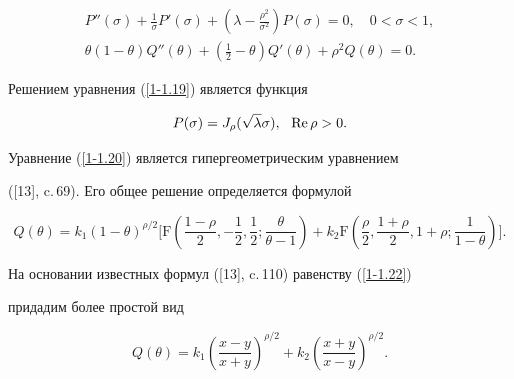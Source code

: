 \begin{gather}


P''(\sigma)+\frac{1}{\sigma}P'(\sigma)+


\left(\lambda -\frac{\rho^2}{\sigma^2}


\right)P(\sigma) = 0,\quad 0<\sigma<1,\label{1-1.19} \\


%


\theta(1-\theta )Q''(\theta)+\left(\frac12 - \theta\right)Q'(\theta) + 


\rho^2Q(\theta) = 0.\label{1-1.20}


\end{gather}


Решением уравнения (\ref{1-1.19}) является функция


\begin{equation}


P(\sigma)=J_{\rho}(\sqrt{\lambda}\sigma),


\ \ \re\rho >0.\label{1-1.21}


\end{equation}





Уравнение (\ref{1-1.20}) является гипергеометрическим уравнением 


([13], c.\,69). Его общее решение определяется формулой


\begin{equation}


Q(\theta)=k_1(1-\theta)^{\rho/2}\bigg[


{\mathrm F}\left(\frac{1-\rho}{2},-\frac12,


\frac12;\frac{\theta}{\theta-1}\right) +


k_2{\mathrm F}\left(\frac\rho2,\frac{1+\rho}{2},


1+\rho;\frac{1}{1-\theta}\right)\bigg].\label{1-1.22}


\end{equation}





На основании известных формул ([13], c.\,110) равенству (\ref{1-1.22}) 


придадим более простой вид


\begin{equation}


Q(\theta)=k_1\left(\frac{x-y}{x+y}\right)^{\rho/2}+k_2\left(\frac{x+y}{x-y}


\right)^{\rho/2}.\label{1-1.23}


\end{equation}





